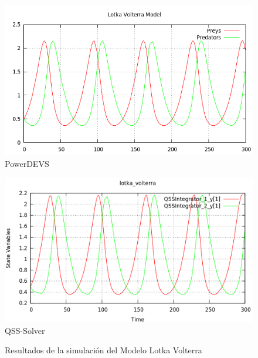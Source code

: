 \documentclass{beamer}
\begin{document}
\begin{frame}
\begin{figure}[H]
\centering
\begin{minipage}{0.5\textwidth}
\centering
 \includegraphics[width=\linewidth]{lotka_volterra-pd}
PowerDEVS \\
\end{minipage}\hfill
\begin{minipage}{0.5\textwidth}
\centering
 \includegraphics[width=\linewidth]{lotka_volterra-qss}
QSS-Solver \\
\end{minipage}
\label{graph:lotka_volterra}
\caption{Resultados de la simulación del Modelo Lotka Volterra}
\end{figure}
\end{frame}
\end{document}
